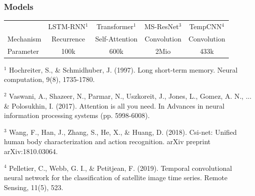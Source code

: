 \begin{frame}
%
%
%
%
%
\end{frame}


\begin{frame}
\frametitle{Models}

\centering\begin{tabular}{lcccc}
	\toprule
	& LSTM-RNN$^1$ & Transformer$^1$ & MS-ResNet$^3$ & TempCNN$^4$ \\
	\cmidrule(lr){2-2}\cmidrule(lr){3-3}\cmidrule(lr){4-4}\cmidrule(lr){5-5}
	Mechanism & Recurrence & Self-Attention & Convolution & Convolution \\
	Parameter & 100k & 600k & 2Mio & 433k \\
	\bottomrule
\end{tabular}

\vspace{2em}

{\small\raggedright

$^1$ Hochreiter, S., \& Schmidhuber, J. (1997). Long short-term memory. Neural computation, 9(8), 1735-1780.

$^2$ Vaswani, A., Shazeer, N., Parmar, N., Uszkoreit, J., Jones, L., Gomez, A. N., ... \& Polosukhin, I. (2017). Attention is all you need. In Advances in neural information processing systems (pp. 5998-6008).

$^3$ Wang, F., Han, J., Zhang, S., He, X., \& Huang, D. (2018). Csi-net: Unified human body characterization and action recognition. arXiv preprint arXiv:1810.03064.

$^4$ Pelletier, C., Webb, G. I., \& Petitjean, F. (2019). Temporal convolutional neural network for the classification of satellite image time series. Remote Sensing, 11(5), 523.

}

\end{frame}


